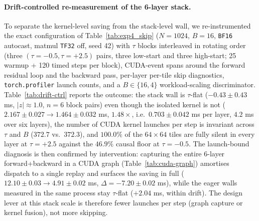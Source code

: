 \documentclass[11pt,a4paper]{article}
\begin{document}
\paragraph{Drift-controlled re-measurement of the 6-layer stack.}
To separate the kernel-level saving from the stack-level wall, we re-instrumented the exact configuration of Table~\ref{tab:exp4_skip} ($N{=}1024$, $B{=}16$, \texttt{BF16} autocast, matmul \texttt{TF32} off, seed 42) with $\tau$ blocks interleaved in rotating order (three $(\tau{=}-0.5, \tau{=}{+}2.5)$ pairs, three low-start and three high-start; 25 warmup + 120 timed steps per block), CUDA-event spans around the forward residual loop and the backward pass, per-layer per-tile skip diagnostics, \texttt{torch.profiler} launch counts, and a $B \in \{16, 4\}$ workload-scaling discriminator. Table~\ref{tab:drift-ctrl} reports the outcome: the stack wall is $\tau$-flat ($-0.43 \pm 0.43$ ms, $|z| \approx 1.0$, $n = 6$ block pairs) even though the isolated kernel is not ($2.167 \pm 0.027 \to 1.464 \pm 0.032$ ms, $1.48\times$, i.e.\ $0.703 \pm 0.042$ ms per layer, $4.2$ ms over six layers), the number of CUDA kernel launches per step is invariant across $\tau$ and $B$ ($372.7$ vs.\ $372.3$), and $100.0\%$ of the $64 \times 64$ tiles are fully silent in every layer at $\tau = +2.5$ against the $46.9\%$ causal floor at $\tau = -0.5$. The launch-bound diagnosis is then confirmed by intervention: capturing the entire 6-layer forward+backward in a CUDA graph (Table~\ref{tab:cuda-graph}) amortises dispatch to a single replay and surfaces the saving in full ($12.10 \pm 0.03 \to 4.91 \pm 0.02$ ms, $\Delta = -7.20 \pm 0.02$ ms), while the eager walls measured in the same process stay $\tau$-flat ($+2.04$ ms, within drift). The design lever at this stack scale is therefore fewer launches per step (graph capture or kernel fusion), not more skipping.
\end{document}
